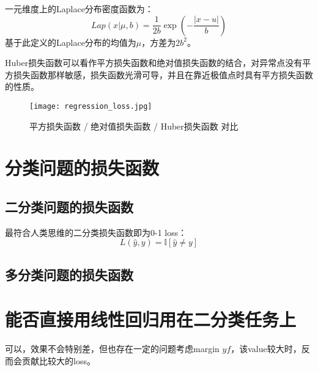 \begin{definition}[Laplace分布] \label{def:laplace} 
  一元维度上的Laplace分布密度函数为：
  \begin{equation}
    Lap(x|\mu, b) = \frac{1}{2b}\exp\left(-\frac{|x-u|}{b}\right)
  \end{equation}
  基于此定义的Laplace分布的均值为$\mu$，方差为$2b^2$。
\end{definition}

Huber损失函数可以看作平方损失函数和绝对值损失函数的结合，对异常点没有平方损失函数那样敏感，损失函数光滑可导，并且在靠近极值点时具有平方损失函数的性质。

\begin{figure}[htbp]
  \centering
  \texttt{[image: regression\_loss.jpg]}
  \caption{平方损失函数 / 绝对值损失函数 / Huber损失函数 对比 \label{fig:regression_loss}}
\end{figure}


\section{分类问题的损失函数}

\subsection{二分类问题的损失函数}

最符合人类思维的二分类损失函数即为0-1 loss：
\begin{equation}
  L(\hat{y}, y) = \mathbb{I}[\hat{y} \neq y]
\end{equation}

\subsection{多分类问题的损失函数}

\section{能否直接用线性回归用在二分类任务上}

可以，效果不会特别差，但也存在一定的问题考虑margin $yf$，该value较大时，反而会贡献比较大的loss。
